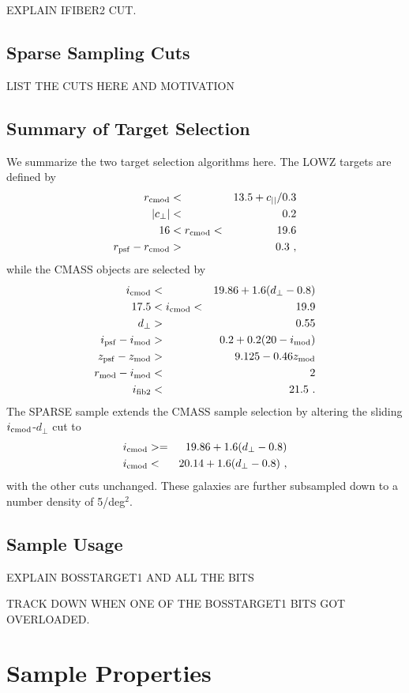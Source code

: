 \documentclass[preprint]{aastex}
\newcommand{\cpp}{c_{\perp}}
\newcommand{\cll}{c_{||}}
\newcommand{\dpp}{d_{\perp}}
\newcommand{\rmod}{r_{\rm mod}}
\newcommand{\imod}{i_{\rm mod}}
\newcommand{\rcmod}{r_{\rm cmod}}
\newcommand{\icmod}{i_{\rm cmod}}
\newcommand{\ipsf}{i_{\rm psf}}
\newcommand{\zpsf}{z_{\rm psf}}
\newcommand{\zmod}{z_{\rm mod}}
\newcommand{\rpsf}{r_{\rm psf}}
\newcommand{\ifib}{i_{\rm fib2}}
\begin{document}
EXPLAIN IFIBER2 CUT.

\subsection{Sparse Sampling Cuts}

LIST THE CUTS HERE AND MOTIVATION

\subsection{Summary of Target Selection}

We summarize the two target selection algorithms here. The LOWZ targets are
defined by 
\begin{eqnarray}
\rcmod  & < & 13.5 + \cll/0.3 \\ 
|\cpp| & < & 0.2 \\
16 & < \rcmod < & 19.6 \\
\rpsf - \rcmod & > & 0.3 \,\,,
\end{eqnarray}
while the CMASS objects are selected by 
\begin{eqnarray}
\icmod & < & 19.86 + 1.6(\dpp - 0.8) \\
17.5 & < \icmod <  & 19.9 \\
\dpp & > & 0.55 \\
\ipsf - \imod & > & 0.2 + 0.2(20 - \imod) \\
\zpsf - \zmod & > & 9.125 - 0.46 \zmod \\
\rmod - \imod & < & 2 \\
\ifib & < & 21.5 \,\,.
\end{eqnarray}
The SPARSE sample extends the CMASS sample selection by altering the sliding
$\icmod$-$\dpp$ cut to 
\begin{eqnarray}
\icmod & >= & 19.86 + 1.6(\dpp - 0.8) \\
\icmod & < & 20.14 + 1.6(\dpp - 0.8) \,\,, 
\end{eqnarray}
with the other cuts unchanged. These galaxies are further subsampled down to a
number density of 5/deg$^2$. 

\subsection{Sample Usage}

EXPLAIN BOSSTARGET1 AND ALL THE BITS

TRACK DOWN WHEN ONE OF THE BOSSTARGET1 BITS GOT OVERLOADED.

\section{Sample Properties}
\end{document}
